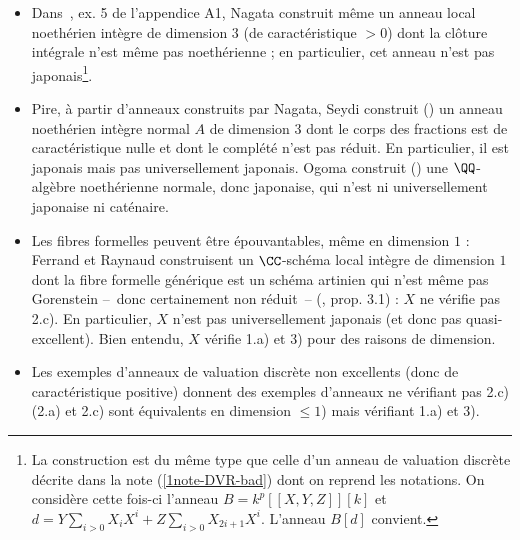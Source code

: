 \documentclass[10pt]{../fichiers-configuration-latex/smfart}
\begin{document}
\begin{itemize}
$\bullet$ le normalisé $A'$ de $A$ est l'anneau des séries convergentes noté $\CC\{x,y\}$ (ne pas
confondre avec l'hensélisé de $\CC[x,y]$) et donc est excellent.

$\bullet\ A$ n'est pas japonais (en fait, $A'$ n'est pas fini sur $A$).

$\bullet\ \chap{A}$ a des composantes immergées (de sorte que -- platitude -- la fibre formelle
générique a des composantes immergées et donc ne vérifie pas 2.c)).


$\bullet\ $ Le lieu normal de $A[[T]]$ n'est pas ouvert.  D'après~ son lieu
régulier n'est donc pas ouvert non plus.

$\bullet$ L'anneau $A$ est formellement caténaire (le spectre de son complété est irréductible). Il
en est donc de même de $A[[T]]$ (\cite{Sey70}).


\item Dans~\cite{Nag62}, ex. 5 de l'appendice A1, Nagata construit même un anneau local noethérien
intègre de dimension $3$ (de caractéristique $>0$) dont la clôture intégrale n'est même pas
noethérienne ; en particulier, cet anneau n'est pas japonais\footnote{La construction est du même
type que celle d'un anneau de valuation discrète décrite dans la note (\ref{1note-DVR-bad}) dont on
reprend les notations. On considère cette fois-ci l'anneau $B=k^p[[X,Y,Z]][k]$ et
$d=Y\sum_{i>0}X_iX^i+Z\sum_{i>0}X_{2i+1}X^i$. L'anneau $B[d]$ convient.}.

\item Pire, à partir d'anneaux construits par Nagata, Seydi construit (\cite{Sey72}) un anneau
noethérien  intègre normal $A$ de dimension $3$ dont le corps des fractions est de caractéristique
nulle et dont le complété n'est pas réduit. En particulier, il est japonais mais pas universellement
japonais. Ogoma construit (\cite{Ogo81}) une $\QQ$-algèbre noethérienne normale, donc japonaise, qui
n'est ni universellement japonaise ni caténaire.

\item Les fibres formelles peuvent être épouvantables, même en dimension $1$ : Ferrand et Raynaud
construisent un $\CC$-schéma local intègre de dimension $1$ dont la fibre formelle générique est un
schéma artinien qui n'est même pas Gorenstein -- donc certainement non réduit -- (\cite{Fer-Ray70},
prop. 3.1) : $X$ ne vérifie pas 2.c). En particulier, $X$ n'est pas universellement japonais (et
donc pas quasi-excellent). Bien entendu, $X$ vérifie 1.a) et 3) pour des raisons de dimension.

\item  Les exemples d'anneaux de valuation discrète non excellents (donc de caractéristique
positive) donnent des exemples d'anneaux ne vérifiant pas 2.c) (2.a) et 2.c) sont équivalents en
dimension $\leq 1$) mais vérifiant 1.a) et 3).


\end{itemize}
\end{document}
